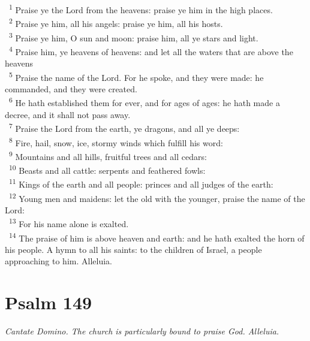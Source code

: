 \documentclass[a5paper,12pt]{article}
\begin{document}
\begin{multicols*}{2}
~\textsuperscript{1} Praise ye the Lord from the heavens: praise ye him in the high places.\\
~\textsuperscript{2} Praise ye him, all his angels: praise ye him, all his hosts.\\
~\textsuperscript{3} Praise ye him, O sun and moon: praise him, all ye stars and light.\\
~\textsuperscript{4} Praise him, ye heavens of heavens: and let all the waters that are above the heavens\\
~\textsuperscript{5} Praise the name of the Lord. For he spoke, and they were made: he commanded, and they were created.\\
~\textsuperscript{6} He hath established them for ever, and for ages of ages: he hath made a decree, and it shall not pass away.\\
~\textsuperscript{7} Praise the Lord from the earth, ye dragons, and all ye deeps:\\
~\textsuperscript{8} Fire, hail, snow, ice, stormy winds which fulfill his word:\\
~\textsuperscript{9} Mountains and all hills, fruitful trees and all cedars:\\
~\textsuperscript{10} Beasts and all cattle: serpents and feathered fowls:\\
~\textsuperscript{11} Kings of the earth and all people: princes and all judges of the earth:\\
~\textsuperscript{12} Young men and maidens: let the old with the younger, praise the name of the Lord:\\
~\textsuperscript{13} For his name alone is exalted.\\
~\textsuperscript{14} The praise of him is above heaven and earth: and he hath exalted the horn of his people. A hymn to all his saints: to the children of Israel, a people approaching to him. Alleluia.\\

\section{Psalm 149}
\label{sec:org5aba236}
\emph{Cantate Domino. The church is particularly bound to praise God. Alleluia.}\\


\end{multicols*}
\end{document}

